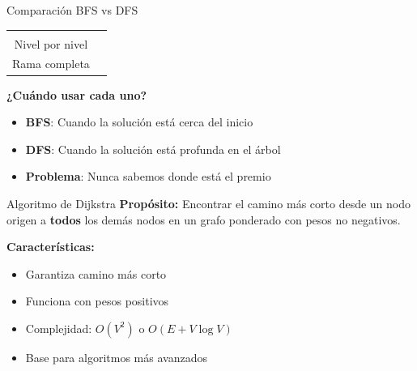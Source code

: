 \documentclass{beamer}
\begin{document}
\begin{frame}{Comparación BFS vs DFS}
    \begin{center}
        \begin{tabular}{cc}
            \begin{minipage}{4cm}
                \centering
                \textbf{BFS}\\[0.1cm]
                {\scriptsize Nivel por nivel}
            \end{minipage} &
            \begin{minipage}{4cm}
                \centering
                \textbf{DFS}\\[0.1cm]
                {\scriptsize Rama completa}
            \end{minipage}
        \end{tabular}
        
        \vspace{0.8cm}
        
        \textbf{¿Cuándo usar cada uno?}
        \begin{itemize}
            \item \textbf{BFS}: Cuando la solución está cerca del inicio
            \item \textbf{DFS}: Cuando la solución está profunda en el árbol
            \item \textbf{Problema}: Nunca sabemos donde está el premio
        \end{itemize}
    \end{center}
\end{frame}

\begin{frame}{Algoritmo de Dijkstra}
    \textbf{Propósito:}
    Encontrar el camino más corto desde un nodo origen a \textbf{todos} los demás nodos en un grafo ponderado con pesos no negativos.
    
    \vspace{0.5cm}
    
    \textbf{Características:}
    \begin{itemize}
        \item Garantiza camino más corto
        \item Funciona con pesos positivos
        \item Complejidad: $O(V^2)$ o $O(E + V \log V)$
        \item Base para algoritmos más avanzados
    \end{itemize}
\end{frame}
\end{document}
